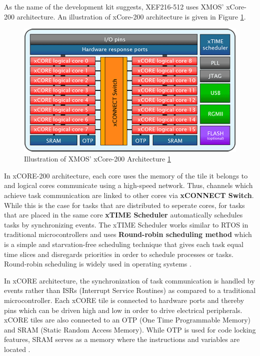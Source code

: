 As the name of the development kit suggests, XEF216-512 uses XMOS' xCore-200 architecture. An illustration of xCore-200 architecture is given in Figure \ref{fig:XE216Architecture}.
\begin{figure}[!ht]
	\includegraphics[scale=0.7]{content/images/XE216Architecture.png}
	\caption{Illustration of XMOS' xCore-200 Architecture \ref{fig:XE216Architecture}}
	\label{fig:XE216Architecture}
\end{figure}

In xCORE-200 architecture, each core uses the memory of the tile it belongs to and logical cores communicate using a high-speed network. Thus, channels which achieve task communication are linked to other cores via \textbf{xCONNECT Switch}. While this is the case for tasks that are distributed to seperate cores, for tasks that are placed in the same core \textbf{xTIME Scheduler} automatically schedules tasks by synchronizing events. The xTIME Scheduler works similar to RTOS in traditional microcontrollers and uses \textbf{Round-robin scheduling method} \cite{xmosdatasheet} \cite{roundrobin} which is a simple and starvation-free scheduling technique that gives each task equal time slices and disregards priorities in order to schedule processes or tasks. Round-robin scheduling is widely used in operating systems \cite{roundrobin}.

In xCORE architecture, the synchronization of task communication is handled by events rather than ISRs (Interrupt Service Routines) as compared to a traditional microcontroller. Each xCORE tile is connected to hardware ports and thereby pins which can be driven high and low in order to drive electrical peripherals. xCORE tiles are also connected to an OTP (One Time Programmable Memory) and SRAM (Static Random Access Memory). While OTP is used for code locking features, SRAM serves as a memory where the instructions and variables are located \cite{xmosdatasheet}.

